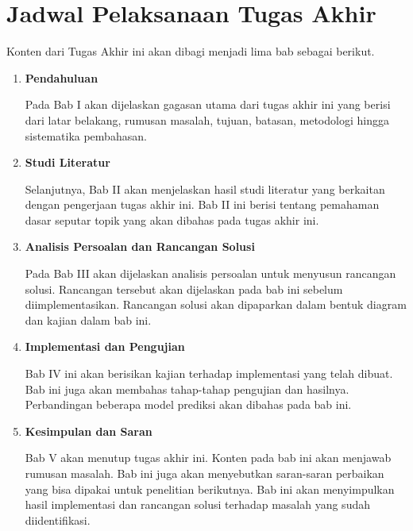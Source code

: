 \section{Jadwal Pelaksanaan Tugas Akhir}

Konten dari Tugas Akhir ini akan dibagi menjadi lima bab sebagai berikut.
\begin{enumerate}
    \item \textbf{Pendahuluan}
    
    Pada Bab I akan dijelaskan gagasan utama dari tugas akhir ini yang berisi dari latar belakang, rumusan masalah, tujuan, batasan, metodologi hingga sistematika pembahasan.

    \item \textbf{Studi Literatur}
    
    Selanjutnya, Bab II akan menjelaskan hasil studi literatur yang berkaitan dengan pengerjaan tugas akhir ini. Bab II ini berisi tentang pemahaman dasar seputar topik yang akan dibahas pada tugas akhir ini.

    \item \textbf{Analisis Persoalan dan Rancangan Solusi}
    
    Pada Bab III akan dijelaskan analisis persoalan untuk menyusun rancangan solusi. Rancangan tersebut akan dijelaskan pada bab ini sebelum diimplementasikan. Rancangan solusi akan dipaparkan dalam bentuk diagram dan kajian dalam bab ini.

    \item \textbf{Implementasi dan Pengujian}
    
    Bab IV ini akan berisikan kajian terhadap implementasi yang telah dibuat. Bab ini juga akan membahas tahap-tahap pengujian dan hasilnya. Perbandingan beberapa model prediksi akan dibahas pada bab ini.

    \item \textbf{Kesimpulan dan Saran}
    
    Bab V akan menutup tugas akhir ini. Konten pada bab ini akan menjawab rumusan masalah. Bab ini juga akan menyebutkan saran-saran perbaikan yang bisa dipakai untuk penelitian berikutnya. Bab ini akan menyimpulkan hasil implementasi dan rancangan solusi terhadap masalah yang sudah diidentifikasi.
\end{enumerate}